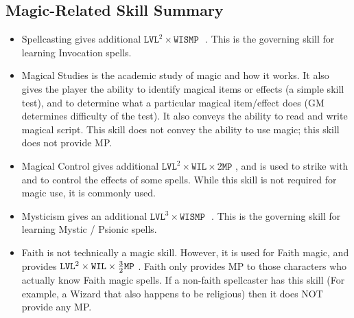 \documentclass[twoside]{book}
\begin{document}
    

\subsection{Magic-Related Skill Summary}
    
\begin{itemize}
      
  \item   Spellcasting gives additional \begin{math}    
                    {\texttt{LVL}}^{ 2 }   \times  \texttt{WIS}\texttt{MP
                     }    \end{math} . This is the governing skill
                      for learning Invocation spells.
              
  \item   Magical Studies is the academic study of magic
                 and how it works. It also gives the player the ability
                 to identify magical items or effects (a simple skill
                 test), and to determine what a particular magical
                 item/effect does (GM determines difficulty of the test).
                 It also conveys the ability to read and write magical
                 script. This skill does not convey the ability to use
                 magic; this skill does not provide MP. 
  \item   Magical Control gives additional \begin{math}    
                    {\texttt{LVL}}^{ 2 }   \times    \texttt{WIL}  
                      \times     2   \texttt{MP}  
                       \end{math} , and is used to strike with and to control
                      the effects of some spells. While this skill is not
                      required for magic use, it is commonly used.
              
  \item   Mysticism gives an additional \begin{math}    
                    {\texttt{LVL}}^{ 3 }   \times    \texttt{WIS}  \texttt{MP
                     }    \end{math} . This is the governing skill
                      for learning Mystic / Psionic spells.
              
  \item   Faith is not technically a magic skill. However,
                 it is used for Faith magic, and provides \begin{math}  
                    {\texttt{LVL}}^{ 2 }   \times    \texttt{WIL}  
                      \times    {{ 3 }\over{ 2
                      }}  \texttt{MP}    \end{math} . Faith
                      only provides MP to those characters who actually
                      know Faith magic spells. If a non-faith spellcaster
                      has this skill (For example, a Wizard that also
                      happens to be religious) then it does NOT provide
                      any MP.
              

\end{itemize}
\end{document}
